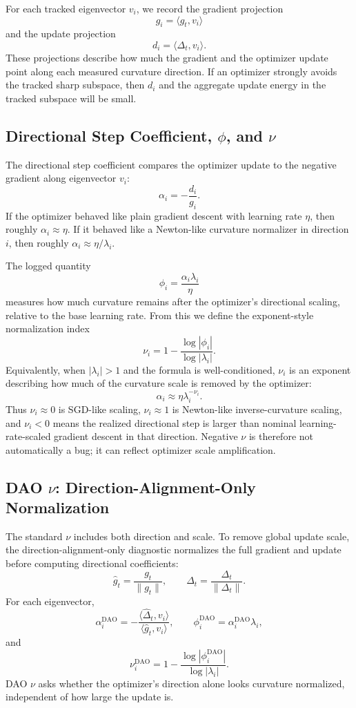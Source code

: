 \documentclass[11pt]{article}
\begin{document}
For each tracked eigenvector $v_i$, we record the gradient projection
\[
    g_i = \langle g_t, v_i \rangle
\]
and the update projection
\[
    d_i = \langle \Delta_t, v_i \rangle.
\]
These projections describe how much the gradient and the optimizer update
point along each measured curvature direction. If an optimizer strongly avoids
the tracked sharp subspace, then $d_i$ and the aggregate update energy in the
tracked subspace will be small.

\subsection{Directional Step Coefficient, \texorpdfstring{$\phi$}{phi}, and \texorpdfstring{$\nu$}{nu}}

The directional step coefficient compares the optimizer update to the negative
gradient along eigenvector $v_i$:
\[
    \alpha_i = -\frac{d_i}{g_i}.
\]
If the optimizer behaved like plain gradient descent with learning rate
$\eta$, then roughly $\alpha_i \approx \eta$. If it behaved like a Newton-like
curvature normalizer in direction $i$, then roughly
$\alpha_i \approx \eta / \lambda_i$.

The logged quantity
\[
    \phi_i = \frac{\alpha_i \lambda_i}{\eta}
\]
measures how much curvature remains after the optimizer's directional scaling,
relative to the base learning rate. From this we define the exponent-style
normalization index
\[
    \nu_i = 1 - \frac{\log |\phi_i|}{\log |\lambda_i|}.
\]
Equivalently, when $|\lambda_i|>1$ and the formula is well-conditioned,
$\nu_i$ is an exponent describing how much of the curvature scale is removed
by the optimizer:
\[
    \alpha_i \approx \eta \lambda_i^{-\nu_i}.
\]
Thus $\nu_i \approx 0$ is SGD-like scaling, $\nu_i \approx 1$ is
Newton-like inverse-curvature scaling, and $\nu_i < 0$ means the realized
directional step is larger than nominal learning-rate-scaled gradient descent
in that direction. Negative $\nu$ is therefore not automatically a bug; it can
reflect optimizer scale amplification.

\subsection{DAO \texorpdfstring{$\nu$}{nu}: Direction-Alignment-Only Normalization}

The standard $\nu$ includes both direction and scale. To remove global update
scale, the direction-alignment-only diagnostic normalizes the full gradient
and update before computing directional coefficients:
\[
    \hat{g}_t = \frac{g_t}{\|g_t\|}, \qquad
    \hat{\Delta}_t = \frac{\Delta_t}{\|\Delta_t\|}.
\]
For each eigenvector,
\[
    \alpha_i^{\mathrm{DAO}}
    = -\frac{\langle \hat{\Delta}_t, v_i\rangle}
            {\langle \hat{g}_t, v_i\rangle},
\qquad
    \phi_i^{\mathrm{DAO}}
    = \alpha_i^{\mathrm{DAO}} \lambda_i,
\]
and
\[
    \nu_i^{\mathrm{DAO}}
    = 1 - \frac{\log |\phi_i^{\mathrm{DAO}}|}{\log |\lambda_i|}.
\]
DAO $\nu$ asks whether the optimizer's direction alone looks curvature
normalized, independent of how large the update is.
\end{document}
